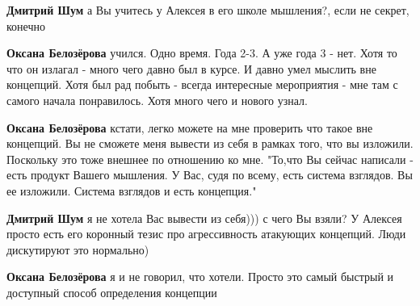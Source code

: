 \begin{itemize}
\begin{itemize}
\textbf{Дмитрий Шум} а Вы учитесь у Алексея в его школе мышления?, если не секрет, конечно

 
\textbf{Оксана Белозёрова} учился. Одно время. Года 2-3. А уже года 3 - нет.
Хотя то что он излагал - много чего давно был в курсе. И давно умел мыслить вне
концепций. Хотя был рад побыть - всегда интересные мероприятия - мне там с
самого начала понравилось. Хотя много чего и нового узнал.

 
\textbf{Оксана Белозёрова} кстати, легко можете на мне проверить что такое вне
концепций. Вы не сможете меня вывести из себя в рамках того, что вы изложили.
Поскольку это тоже внешнее по отношению ко мне. "То,что Вы сейчас написали -
есть продукт Вашего мышления. У Вас, судя по всему, есть система взглядов. Вы
ее изложили. Система взглядов и есть концепция."

 
\textbf{Дмитрий Шум} я не хотела Вас вывести из себя))) с чего Вы взяли? У Алексея просто есть его коронный тезис про агрессивность атакующих концепций. Люди дискутируют это нормально)

 
\textbf{Оксана Белозёрова} я и не говорил, что хотели. Просто это самый быстрый и доступный способ определения концепции

\end{itemize}

 


\end{itemize}
